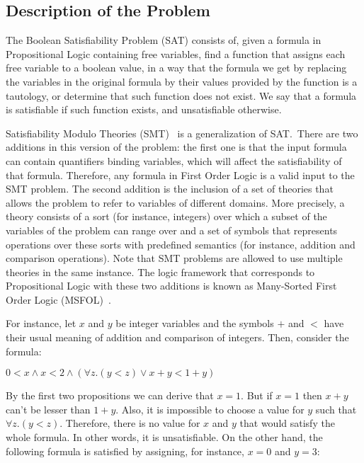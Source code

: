 \subsection{Description of the Problem}

The Boolean Satisfiability Problem (SAT) consists of, given a formula in Propositional Logic containing free variables, find a function that assigns each free variable to a boolean value, in a way that the formula we get by replacing the variables in the original formula by their values provided by the function is a tautology, or determine that such function does not exist. We say that a formula is satisfiable if such function exists, and unsatisfiable otherwise.

Satisfiability Modulo Theories (SMT)~\cite{smt} is a generalization of SAT.\ There are two additions in this version of the problem: the first one is that the input formula can contain quantifiers binding variables, which will affect the satisfiability of that formula. Therefore, any formula in First Order Logic is a valid input to the SMT problem. The second addition is the inclusion of a set of theories that allows the problem to refer to variables of different domains. More precisely, a theory consists of a sort (for instance, integers) over which a subset of the variables of the problem can range over and a set of symbols that represents operations over these sorts with predefined semantics (for instance, addition and comparison operations). Note that SMT problems are allowed to use multiple theories in the same instance. The logic framework that corresponds to Propositional Logic with these two additions is known as Many-Sorted First Order Logic (MSFOL)~\cite{many_sorted}.

For instance, let $x$ and $y$ be integer variables and the symbols $+$ and $<$ have their usual meaning of addition and comparison of integers. Then, consider the formula:

\begin{center}
  $0 < x \land x < 2 \land (\forall z . (y < z) \lor x + y < 1 + y)$
\end{center}

By the first two propositions we can derive that $x = 1$. But if $x = 1$ then $x + y$ can't be lesser than $1 + y$. Also, it is impossible to choose a value for $y$ such that $\forall z . (y < z)$. Therefore, there is no value for $x$ and $y$ that would satisfy the whole formula. In other words, it is unsatisfiable. On the other hand, the following formula is satisfied by assigning, for instance, $x = 0$ and $y = 3$:

